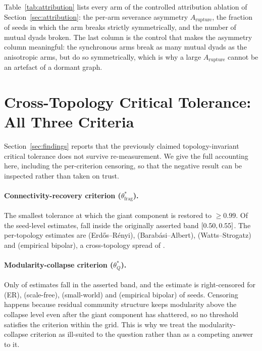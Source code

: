 Table~\ref{tab:attribution} lists every arm of the controlled attribution ablation of
Section~\ref{sec:attribution}: the per-arm severance asymmetry $A_{\mathrm{rupture}}$, the
fraction of seeds in which the arm breaks strictly symmetrically, and the number of mutual
dyads broken. The last column is the control that makes the asymmetry column meaningful:
the synchronous arms break as many mutual dyads as the anisotropic arms, but do so
symmetrically, which is why a large $A_{\mathrm{rupture}}$ cannot be an artefact of a
dormant graph.

\begin{table}[t]
\centering
\small
\caption{\textbf{Attribution Ablation Arms.} Generated from \texttt{results/phase4\_attribution.json}.}
\label{tab:attribution}

\end{table}

\section{Cross-Topology Critical Tolerance: All Three Criteria}
\label{app:threshold}

Section~\ref{sec:findings} reports that the previously claimed topology-invariant critical
tolerance does not survive re-measurement. We give the full accounting here, including the
per-criterion censoring, so that the negative result can be inspected rather than taken on
trust.

\paragraph{Connectivity-recovery criterion ($\theta^*_{\mathrm{frag}}$).} The smallest
tolerance at which the giant component is restored to $\geq 0.99$. Of the
\ThresholdFragEstimates{} seed-level estimates, \ThresholdFragInBand{} fall inside the
originally asserted band $[0.50, 0.55]$. The per-topology
estimates are \ThresholdFragErdosRenyi{} (Erd\H{o}s--R\'enyi), \ThresholdFragScaleFree{}
(Barab\'asi--Albert), \ThresholdFragSmallWorld{} (Watts--Strogatz) and
\ThresholdFragEmpiricalBipolar{} (empirical bipolar), a cross-topology spread of
\ThresholdFragSpread.

\paragraph{Modularity-collapse criterion ($\theta^*_Q$).} Only \ThresholdQInBand{} of
\ThresholdQEstimates{} estimates fall in the asserted band, and the estimate is
right-censored for \ThresholdQCensoredErdosRenyi{} (ER),
\ThresholdQCensoredScaleFree{} (scale-free),
\ThresholdQCensoredSmallWorld{} (small-world) and
\ThresholdQCensoredEmpiricalBipolar{} (empirical bipolar) of \ThresholdSeeds{} seeds.
Censoring happens because residual community structure keeps modularity above the collapse
level even after the giant component has shattered, so no threshold satisfies the
criterion within the grid. This is why we treat the modularity-collapse criterion as
ill-suited to the question rather than as a competing answer to it.

